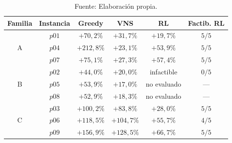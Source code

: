 \begin{table}[H]
    \centering
    \caption{\label{tab:consolidada} Resultados consolidados sobre las nueve instancias del conjunto NEO evaluadas. Gap respecto a la mejor solución conocida, en porcentaje. El agente RL se reporta como media sobre semillas factibles.}
    \caption*{Fuente: Elaboración propia.}
    \small
    \renewcommand{\arraystretch}{1.15}
    \setlength{\tabcolsep}{7pt}
    \begin{tabular}{@{}cccccc@{}}
        \toprule
        \textbf{Familia} & \textbf{Instancia} & \textbf{Greedy} & \textbf{VNS} & \textbf{RL} & \textbf{Factib. RL} \\
        \midrule
        \multirow{3}{*}{A} & $p01$ &  $+70{,}2\%$ &  $+31{,}7\%$ & $+19{,}7\%$  & $5/5$ \\
                           & $p04$ & $+212{,}8\%$ &  $+23{,}1\%$ & $+53{,}9\%$  & $5/5$ \\
                           & $p07$ &  $+75{,}1\%$ &  $+27{,}3\%$ & $+57{,}4\%$  & $5/5$ \\
        \midrule
        \multirow{3}{*}{B} & $p02$ &  $+44{,}0\%$ &  $+20{,}0\%$ & infactible   & $0/5$ \\
                           & $p05$ &  $+53{,}9\%$ &  $+17{,}0\%$ & no evaluado  & --- \\
                           & $p08$ &  $+52{,}9\%$ &  $+18{,}3\%$ & no evaluado  & --- \\
        \midrule
        \multirow{3}{*}{C} & $p03$ & $+100{,}2\%$ &  $+83{,}8\%$ & $+28{,}0\%$  & $5/5$ \\
                           & $p06$ & $+118{,}5\%$ & $+104{,}7\%$ & $+55{,}7\%$  & $4/5$ \\
                           & $p09$ & $+156{,}9\%$ & $+128{,}5\%$ & $+66{,}7\%$  & $5/5$ \\
        \bottomrule
    \end{tabular}
\end{table}

